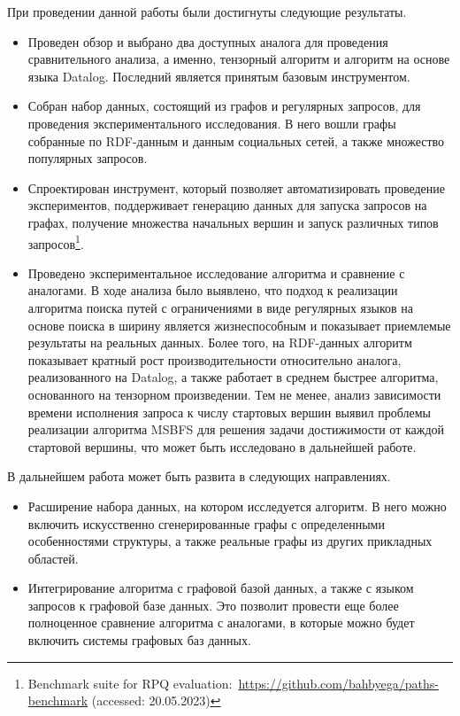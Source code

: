 
При проведении данной работы были достигнуты следующие результаты. 

\begin{itemize}
    \item Проведен обзор и выбрано два доступных аналога для проведения сравнительного анализа, а именно, тензорный алгоритм и алгоритм на основе языка Datalog. Последний является принятым базовым инструментом.
    \item Собран набор данных, состоящий из графов и регулярных запросов, для проведения экспериментального исследования. В него вошли графы собранные по RDF-данным и данным социальных сетей, а также множество популярных запросов.
    \item Спроектирован инструмент, который позволяет автоматизировать проведение экспериментов, поддерживает генерацию данных для запуска запросов на графах, получение множества начальных вершин и запуск различных типов запросов\footnote{Benchmark suite for RPQ evaluation:~\href{https://github.com/bahbyega/paths-benchmark}{https://github.com/bahbyega/paths-benchmark} (accessed: 20.05.2023)}.
    \item Проведено экспериментальное исследование алгоритма и сравнение с аналогами. В ходе анализа было выявлено, что подход к реализации алгоритма поиска путей с ограничениями в виде регулярных языков на основе поиска в ширину является жизнеспособным и показывает приемлемые результаты на реальных данных. 
    Более того, на RDF-данных алгоритм показывает кратный рост производительности относительно аналога, реализованного на Datalog, а также работает в среднем быстрее алгоритма, основанного на тензорном произведении. Тем не менее, анализ зависимости времени исполнения запроса к числу стартовых вершин выявил проблемы реализации алгоритма MSBFS для решения задачи достижимости от каждой стартовой вершины, что может быть исследовано в дальнейшей работе. 
    \end{itemize}

В дальнейшем работа может быть развита в следующих направлениях.
\begin{itemize}
    \item Расширение набора данных, на котором исследуется алгоритм. В него можно включить искусственно сгенерированные графы с определенными особенностями структуры, а также реальные графы из других прикладных областей.
    \item Интегрирование алгоритма с графовой базой данных, а также с языком запросов к графовой базе данных. Это позволит провести еще более полноценное сравнение алгоритма с аналогами, в которые можно будет включить системы графовых баз данных. 
\end{itemize}
\noindent 
